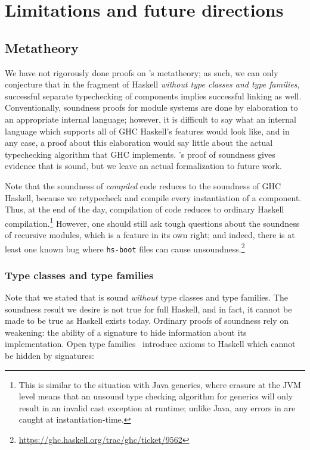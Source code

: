\chapter{Limitations and future directions}
\label{sec:limitations}

\section{Metatheory}
\label{sec:metatheory}

We have not rigorously done proofs on \Backpack{}'s metatheory; as such,
we can only conjecture that in the fragment of Haskell \emph{without type
classes and type families}, successful separate typechecking of
components implies successful linking as well.  Conventionally,
soundness proofs for module systems are done by elaboration to an
appropriate internal language; however, it is difficult to say what an
internal language which supports all of GHC Haskell's features would
look like, and in any case, a proof about this elaboration would say
little about the actual typechecking algorithm that GHC
implements.  \OldBackpack{}'s proof
of soundness gives evidence that \Backpack{} is sound, but we leave
an actual formalization to future work.

Note that the soundness of \emph{compiled} \Backpack{} code reduces to
the soundness of GHC Haskell, because we retypecheck and compile every
instantiation of a component. Thus, at the end of the day, compilation
of \Backpack{} code reduces to ordinary Haskell
compilation.\footnote{This is similar to the situation with Java
generics, where erasure at the JVM level means that an unsound type
checking algorithm for generics will only result in an invalid cast
exception at runtime; unlike Java, any errors in \Backpack{} are caught
at instantiation-time.}  However, one should still ask tough questions
about the soundness of recursive modules, which is a feature in its own
right; and indeed, there is at least one known bug where \verb|hs-boot|
files can cause
unsoundness.\footnote{\url{https://ghc.haskell.org/trac/ghc/ticket/9562}}

\subsection{Type classes and type families}

Note that we stated that \Backpack{} is sound \emph{without} type classes
and type families.  The soundness result we desire is not true for full
Haskell, and in fact, it cannot be made to be true as Haskell exists today.
Ordinary proofs of soundness rely on weakening: the ability of a signature
to hide information about its implementation.
Open type families~\cite{schrijvers+:typefamilies}
introduce axioms to Haskell which cannot be hidden by signatures:

